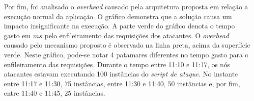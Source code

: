 Por fim, foi analisado o \emph{overhead} causado pela arquitetura proposta em relação a execução normal da aplicação. O gráfico %
demonstra que a solução causa um impacto insignificante na execução. A parte verde do gráfico denota o tempo gasto em $ms$ pelo enfileiramento das requisições dos atacantes. O \emph{overhead} causado pelo mecanismo proposto é observado na linha preta, acima da superfície verde. Neste gráfico, pode-se notar 4 patamares diferentes no tempo gasto para o enfileiramento das requisições. Durante o tempo entre 11:10 e 11:17, os nós atacantes estavam executando 100 instâncias do \emph{script de ataque.} No instante entre 11:17 e 11:30, 75 instâncias, entre 11:30 e 11:40, 50 instâncias e, por fim, entre 11:40 e 11:45, 25 instâncias.



